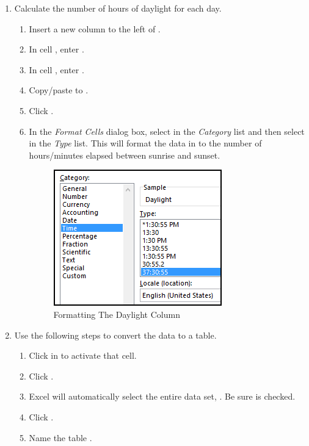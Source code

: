 \begin{enumerate}[resume]
	\item Calculate the number of hours of daylight for each day.
	
	\begin{enumerate}
		\item Insert a new column to the left of .
		\item In cell , enter .
		\item In cell , enter .
		\item Copy/paste  to .
		\item Click . 
		\item In the \textit{Format Cells} dialog box, select  in the \textit{Category} list and then select  in the \textit{Type} list. This will format the data in  to the number of hours/minutes elapsed between sunrise and sunset.
		
		\begin{figure}[H]
			\centering
			\includegraphics[width=\maxwidth{.75\linewidth}]{gfx/ch09_fig80}
			\caption{Formatting The Daylight Column}
			\label{09:fig80}
		\end{figure}
		
		
	\end{enumerate}
	
	\item Use the following steps to convert the data to a table.
	
	\begin{enumerate}
		\item Click in  to activate that cell.
		\item Click .
		\item Excel will automatically select the entire data set, . Be sure  is checked.
		\item Click .
		\item Name the table .
	\end{enumerate}
	

\end{enumerate}
